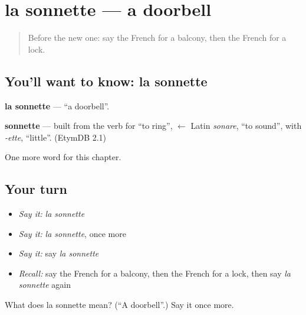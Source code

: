 \section[la sonnette]{la sonnette — a doorbell}

\label{lesson:FR-C163-sonnette}



\begin{quote}
Before the new one: say the French for a balcony, then the French for a lock.
\end{quote}

\subsection*{You'll want to know: la sonnette}
\textbf{la sonnette} — \textquotedblleft{}a doorbell\textquotedblright{}.

\begin{cousinweb}
\textbf{sonnette} — built from the verb for \textquotedblleft{}to ring\textquotedblright{}, $\leftarrow$ Latin \emph{sonare}, \textquotedblleft{}to sound\textquotedblright{}, with \emph{-ette}, \textquotedblleft{}little\textquotedblright{}. (EtymDB 2.1)
\end{cousinweb}

\begin{grammarlens}[title={What you've built}]
One more word for this chapter.
\end{grammarlens}

\subsection*{Your turn}
\begin{itemize}
\raggedright
  \item \emph{Say it:} \emph{la sonnette}
  \item \emph{Say it:} \emph{la sonnette}, once more
  \item \emph{Say it:} say \emph{la sonnette}
  \item \emph{Recall:} say the French for a balcony, then the French for a lock, then say \emph{la sonnette} again
\end{itemize}

\begin{tcolorbox}[breakable,colback=teal!4,colframe=teal!35!black,title={Before you move on}]
What does la sonnette mean? (\textquotedblleft{}A doorbell\textquotedblright{}.) Say it once more.
\end{tcolorbox}
